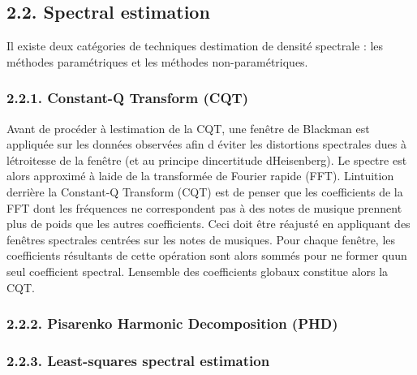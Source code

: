 \documentclass[letterpaper]{article}
\begin{document}
\subsection*{2.2. Spectral estimation}

Il existe deux catégories de techniques d\textquotesingle estimation de densité spectrale : les méthodes paramétriques et les méthodes non-paramétriques.


\subsubsection*{2.2.1. Constant-Q Transform (CQT)}

Avant de procéder à l\textquotesingle estimation de la CQT, une fenêtre de Blackman est appliquée sur les données observées afin d\textquotesingle
 éviter les distortions spectrales dues à l\textquotesingle étroitesse de la fenêtre (et au principe d\textquotesingle incertitude d\textquotesingle Heisenberg).
Le spectre est alors approximé à l\textquotesingle aide de la transformée de Fourier rapide (FFT). L\textquotesingle intuition derrière la Constant-Q 
Transform (CQT)
est de penser que les coefficients de la FFT dont les fréquences ne correspondent pas à des notes de musique prennent plus de poids que les autres
coefficients. Ceci doit être réajusté en appliquant des fenêtres spectrales centrées sur les notes de musiques. Pour chaque fenêtre, les coefficients résultants de cette opération sont alors sommés pour ne former qu\textquotesingle un seul coefficient spectral. L\textquotesingle ensemble des coefficients globaux
constitue alors la CQT.


\subsubsection*{2.2.2. Pisarenko Harmonic Decomposition (PHD)}



\citep{MA}

\subsubsection*{2.2.3. Least-squares spectral estimation}
\end{document}
